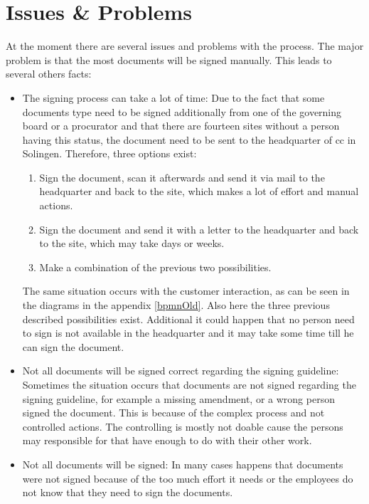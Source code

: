 \section{Issues \& Problems} \label{sec:issues}
At the moment there are several issues and problems with the process. The major problem is that the most documents will be signed manually. This leads to several others facts:
\begin{itemize}
	\item The signing process can take a lot of time: \newline
	Due to the fact that some documents type need to be signed additionally from one of the governing board or a procurator and that there are fourteen sites without a person having this status, the document need to be sent to the headquarter of \gls{cc} in Solingen. Therefore, three options exist:
	\begin{enumerate}
		\item Sign the document, scan it afterwards and send it via mail to the headquarter and back to the site, which makes a lot of effort and manual actions.
		\item Sign the document and send it with a letter to the headquarter and back to the site, which may take days or weeks.
		\item Make a combination of the previous two possibilities.
	\end{enumerate}
	The same situation occurs with the customer interaction, as can be seen in the diagrams in the appendix \ref{bpmnOld}. Also here the three previous described possibilities exist. \newline
	Additional it could happen that no person need to sign is not available in the headquarter and it may take some time till he can sign the document.
	\item Not all documents will be signed correct regarding the signing guideline: \newline
	Sometimes the situation occurs that documents are not signed regarding the signing guideline, for example a missing amendment, or a wrong person signed the document. This is because of the complex process and not controlled actions. The controlling is mostly not doable cause the persons may responsible for that have enough to do with their other work.
	\item Not all documents will be signed:\newline
	In many cases happens that documents were not signed because of the too much effort it needs or the employees do not know that they need to sign the documents. 
\end{itemize} 
